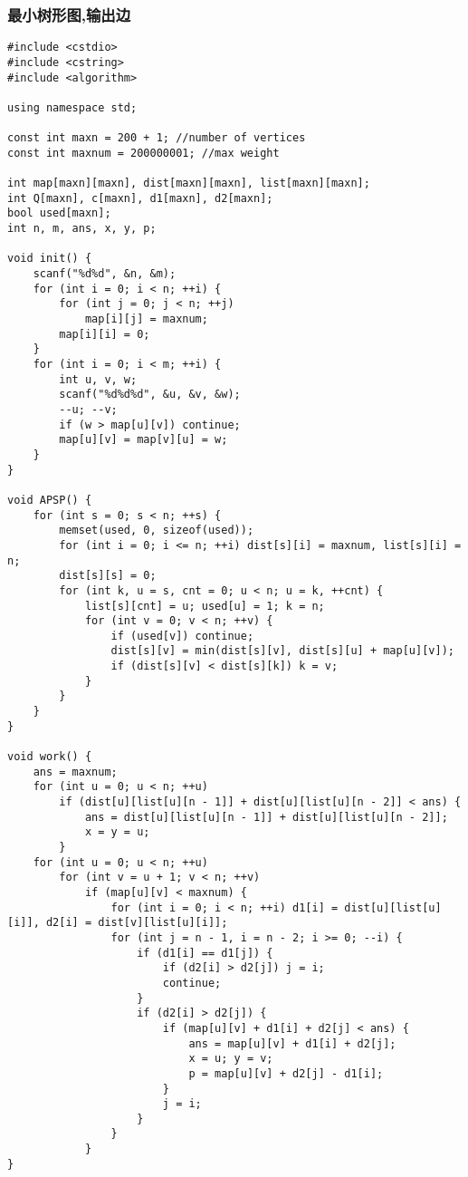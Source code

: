 \subsubsection{最小树形图,输出边}
\begin{verbatim}
#include <cstdio>
#include <cstring>
#include <algorithm>

using namespace std;

const int maxn = 200 + 1; //number of vertices
const int maxnum = 200000001; //max weight

int map[maxn][maxn], dist[maxn][maxn], list[maxn][maxn];
int Q[maxn], c[maxn], d1[maxn], d2[maxn];
bool used[maxn];
int n, m, ans, x, y, p;

void init() {
    scanf("%d%d", &n, &m);
    for (int i = 0; i < n; ++i) {
        for (int j = 0; j < n; ++j)
            map[i][j] = maxnum;
        map[i][i] = 0;
    }
    for (int i = 0; i < m; ++i) {
        int u, v, w;
        scanf("%d%d%d", &u, &v, &w);
        --u; --v;
        if (w > map[u][v]) continue;
        map[u][v] = map[v][u] = w;
    }
}

void APSP() {
    for (int s = 0; s < n; ++s) {
        memset(used, 0, sizeof(used));
        for (int i = 0; i <= n; ++i) dist[s][i] = maxnum, list[s][i] = n;
        dist[s][s] = 0;
        for (int k, u = s, cnt = 0; u < n; u = k, ++cnt) {
            list[s][cnt] = u; used[u] = 1; k = n;
            for (int v = 0; v < n; ++v) {
                if (used[v]) continue;
                dist[s][v] = min(dist[s][v], dist[s][u] + map[u][v]);
                if (dist[s][v] < dist[s][k]) k = v;
            }
        }
    }
}

void work() {
    ans = maxnum;
    for (int u = 0; u < n; ++u)
        if (dist[u][list[u][n - 1]] + dist[u][list[u][n - 2]] < ans) {
            ans = dist[u][list[u][n - 1]] + dist[u][list[u][n - 2]];
            x = y = u;
        }
    for (int u = 0; u < n; ++u)
        for (int v = u + 1; v < n; ++v)
            if (map[u][v] < maxnum) {
                for (int i = 0; i < n; ++i) d1[i] = dist[u][list[u][i]], d2[i] = dist[v][list[u][i]];
                for (int j = n - 1, i = n - 2; i >= 0; --i) {
                    if (d1[i] == d1[j]) {
                        if (d2[i] > d2[j]) j = i;
                        continue;
                    }
                    if (d2[i] > d2[j]) {
                        if (map[u][v] + d1[i] + d2[j] < ans) {
                            ans = map[u][v] + d1[i] + d2[j];
                            x = u; y = v;
                            p = map[u][v] + d2[j] - d1[i];
                        }
                        j = i;
                    }
                }
            }
}


\end{verbatim}
